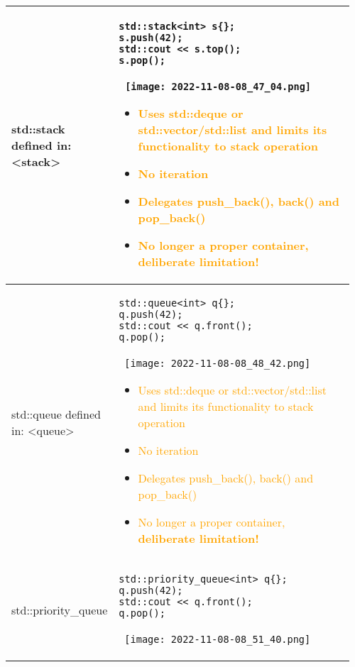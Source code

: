 \documentclass[main.tex,fontsize=8pt,paper=a4,paper=portrait,DIV=calc]{scrartcl}
\begin{document}
\begin{table}[ht!]
\begin{tabular}{|m{0.2\linewidth}|m{0.755\linewidth}|}
\hline
std::stack \newline 
defined in: <stack> & 
\begin{lstlisting}
std::stack<int> s{};
s.push(42);
std::cout << s.top();
s.pop();
\end{lstlisting}
\, \newline
\texttt{[image: 2022-11-08-08\_47\_04.png]}\newline
\begin{itemize}
\item \textcolor{orange}{Uses std::deque or std::vector/std::list and limits its functionality to stack operation}
\item \textcolor{orange}{No iteration}
\item \textcolor{orange}{Delegates push\_back(), back() and pop\_back()}
\item \textcolor{orange}{No longer a proper container, \textbf{deliberate limitation!}}
\vspace{-2mm}
\end{itemize}\\
\hline
std::queue  \newline 
defined in: <queue> & 
\begin{lstlisting}
std::queue<int> q{};
q.push(42);
std::cout << q.front();
q.pop();
\end{lstlisting}
\, \newline
\texttt{[image: 2022-11-08-08\_48\_42.png]}\newline
\begin{itemize}
\item \textcolor{orange}{Uses std::deque or std::vector/std::list and limits its functionality to stack operation}
\item \textcolor{orange}{No iteration}
\item \textcolor{orange}{Delegates push\_back(), back() and pop\_back()}
\item \textcolor{orange}{No longer a proper container, \textbf{deliberate limitation!}}
\vspace{-2mm}
\end{itemize}\\
\hline
std::priority\_queue & 
\begin{lstlisting}
std::priority_queue<int> q{};
q.push(42);
std::cout << q.front();
q.pop();
\end{lstlisting}
\, \newline
\texttt{[image: 2022-11-08-08\_51\_40.png]}\newline
\begin{itemize}

\end{itemize}
\end{tabular}
\end{table}
\end{document}
